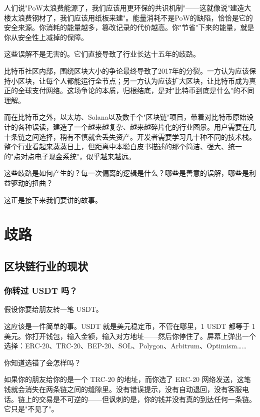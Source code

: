 \documentclass[a4paper,12pt,openany]{ctexbook}
\begin{document}
人们说"PoW太浪费能源了，我们应该用更环保的共识机制"——这就像说"建造大楼太浪费钢材了，我们应该用纸板来建"。能量消耗不是PoW的缺陷，恰恰是它的安全来源。你消耗的能量越多，篡改记录的代价越高。你"节省"下来的能量，就是你从安全性上减掉的保障。

这些误解不是无害的。它们直接导致了行业长达十五年的歧路。

比特币社区内部，围绕区块大小的争论最终导致了2017年的分裂。一方认为应该保持小区块，让每个人都能运行全节点；另一方认为应该扩大区块，让比特币成为真正的全球支付网络。这场争论的本质，归根结底，是对"比特币到底是什么"的不同理解。

而在比特币之外，以太坊、Solana以及数千个"区块链"项目，带着对比特币原始设计的各种误读，建造了一个越来越复杂、越来越碎片化的行业图景。用户需要在几十条链之间选择，稍有不慎就会丢失资产。开发者需要学习几十种不同的技术栈。整个行业看起来蒸蒸日上，但距离中本聪白皮书描述的那个简洁、强大、统一的"点对点电子现金系统"，似乎越来越远。

这些歧路是如何产生的？每一次偏离的逻辑是什么？哪些是善意的误解，哪些是利益驱动的扭曲？

这正是接下来我们要讲的故事。




\part{歧路}



\chapter{区块链行业的现状}



\section*{你转过 USDT 吗？}


假设你要给朋友转一笔 USDT。

这应该是一件简单的事。USDT 就是美元稳定币，不管在哪里，1 USDT 都等于 1 美元。你打开钱包，输入金额，输入对方地址——然后你停住了。屏幕上弹出一个选择：ERC-20、TRC-20、BEP-20、SOL、Polygon、Arbitrum、Optimism……

你知道选错了会怎样吗？

如果你的朋友给你的是一个 TRC-20 的地址，而你选了 ERC-20 网络发送，这笔钱就会消失在两条链之间的缝隙里。没有错误提示，没有自动退回，没有客服电话。链上的交易是不可逆的——但讽刺的是，你的钱并没有真的到达任何一条链。它只是"不见了"。
\end{document}
